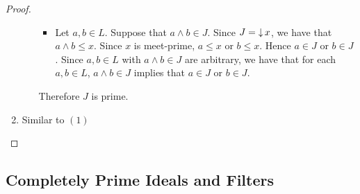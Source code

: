 \documentclass{book}
\begin{document}
\begin{proof}
\begin{enumerate}
\begin{itemize}
\begin{itemize}
					\item Let $a,b \in L$. Suppose that $a \wedge b \in J$. Since $J = \operatorname{\downarrow} x$, we have that $a \wedge b \leq x$. Since $x$ is meet-prime, $a \leq x$ or $b \leq x$. Hence $a \in J$ or $b \in J$. Since $a,b \in L$ with $a \wedge b \in J$ are arbitrary, we have that for each $a,b \in L$, $a \wedge b \in J$ implies that $a \in J$ or $b \in J$.
				\end{itemize}
				Therefore $J$ is prime.
			\end{itemize}
			\item Similar to $(1)$ 
		\end{enumerate}
	\end{proof}
	
	
	
	
	
	
	
	
	
	
	
	
	
	
	
	
	
	
	
	
	
	
	
	
	
	
	
	
	
	
	
	
	
	
	
	
	
	
	
	
	
	
	
	
	
	
	
	
	
	
	
	
	
	
	\subsection{Completely Prime Ideals and Filters}
	
\end{document}
